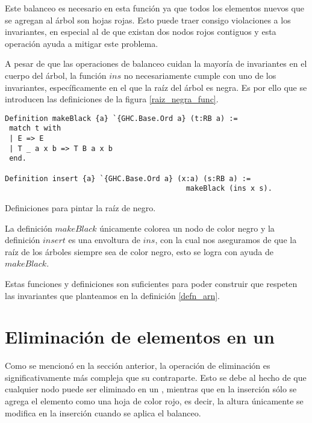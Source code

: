Este balanceo es necesario en esta funci\'on ya que todos los elementos nuevos que se agregan al 
\'arbol son hojas rojas. Esto puede traer consigo violaciones a los invariantes, en especial al de
que existan dos nodos rojos contiguos y esta operaci\'on ayuda a mitigar este problema.

A pesar de que las operaciones de balanceo cuidan la mayoría de invariantes en el cuerpo del 
\'arbol, la función \hyperref[func_ins]{$ins$} no necesariamente cumple con uno de los invariantes, 
espec\'ificamente en el que la raíz del árbol es negra. Es por ello que se introducen las 
definiciones de la figura 
\ref{raiz_negra_func}.

\begin{listing}[!ht]
\centering
\captionsetup{justification=centering}
\begin{verbatim}
Definition makeBlack {a} `{GHC.Base.Ord a} (t:RB a) :=
 match t with
 | E => E
 | T _ a x b => T B a x b
 end.

Definition insert {a} `{GHC.Base.Ord a} (x:a) (s:RB a) :=
                                          makeBlack (ins x s).
\end{verbatim}
\caption{Definiciones para pintar la ra\'iz de negro.}
\label{raiz_negra_func}
\end{listing}

La definici\'on \hyperref[raiz_negra_func]{$makeBlack$} únicamente colorea un nodo de color negro y 
la definición \hyperref[raiz_negra_func]{$insert$} es una envoltura de \hyperref[func_ins]{$ins$}, 
con la cual nos aseguramos de que la ra\'iz de los \'arboles siempre sea de color negro, esto se 
logra con ayuda de \hyperref[raiz_negra_func]{$makeBlack$}.

Estas funciones y definiciones son suficientes para poder construir {\arns} que respeten las
invariantes que planteamos en la definici\'on \ref{defn_arn}.

\section{Eliminación de elementos en un {\arn}}

Como se mencion\'o en la secci\'on anterior, la operaci\'on de eliminaci\'on es significativamente 
m\'as compleja que su contraparte. Esto se debe al hecho de que cualquier nodo puede ser eliminado 
en un {\arn}, mientras que en la inserci\'on s\'olo se agrega el elemento como una hoja de 
color rojo, es decir, la altura \'unicamente se modifica en la inserción cuando se aplica el 
balanceo.

